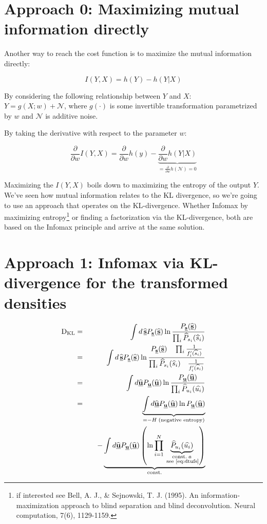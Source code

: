 \newpage

\section{Approach 0: Maximizing mutual information directly}

Another way to reach the cost function is to maximize the mutual information directly:

$$
I(Y,X) = h(Y) - h(Y|X)
$$

By considering the following relationship between $Y$ and $X$:\\
$Y = g(X;w) + \mathcal{N}$, where $g(\cdot)$ is some invertible transformation parametrized by $w$ and $\mathcal{N}$ is additive noise.

By taking the derivative with respect to the parameter $w$:

$$
\frac{\partial}{\partial w} I(Y,X) = \frac{\partial}{\partial w}h(y) - 
\underbrace{\frac{\partial}{\partial w} h(Y|X)}_{= \frac{\partial}{\partial w} h(\mathcal{N}) = 0}
$$

Maximizing the $I(Y,X)$ boils down to maximizing the entropy of the output $Y$. 
We've seen how mutual information relates to the KL divergence, so we're going to use an approach 
that operates on the KL-divergence. 
Whether Infomax by maximizing entropy\footnote{if interested see Bell, A. J., \& Sejnowski, T. J. (1995). An information-maximization approach to blind separation and blind deconvolution. Neural computation, 7(6), 1129-1159.} 
or finding a factorization via the KL-divergence,
both are based on the Infomax principle and arrive at the same solution.

\clearpage

\section{Approach 1: Infomax via KL-divergence for the transformed densities}
\begin{eqnarray}
  \dkl & = & \int d \, \widehat{\vec{s}} P_{\vec{s}}(\widehat{\vec{s}}) \ln \frac{P_{\vec{s}}(\widehat{\vec{s}})}{\prod_i \widehat{P}_{s_i}(\widehat{s}_i)}\\
  & = &  \int d \, \widehat{\vec{s}} P_{\vec{s}}(\widehat{\vec{s}}) \ln 
  \frac
  {P_{\vec{s}}(\widehat{\vec{s}}) \quad \prod_i \frac{1}{f_i' (\widehat{s}_i)}}
  {\prod_i \widehat{P}_{s_i}(\widehat{s}_i) \quad \frac{1}{f_i' (\widehat{s}_i)}} \\
  & = & \int d \widehat{\vec{u}} P_{\vec{u}} (\widehat{\vec{u}}) 
  \ln 
  \frac
  {P_{\vec{u}} (\widehat{\vec{u}}) }
  {\prod_i  \widehat{P}_{u_i}(\widehat{u_i})} \\
  & = & 
  \underbrace{
	  \int d \widehat{\vec{u}} P_{\vec{u}} (\widehat{\vec{u}}) 
	  \ln 
	  {P_{\vec{u}} (\widehat{\vec{u}}) }
  }_{= -H \; \text{(negative entropy)}}\\
  & & \quad -
  \underbrace{
	  \int d \widehat{\vec{u}} P_{\vec{u}} (\widehat{\vec{u}}) 
	  \left( \ln
	  {\prod_{i=1}^{N}
	  \underbrace{ 
		\widehat{P}_{u_i}(\widehat{u_i}) 
	  }_{\substack{\text{const.\;} a \\\text{\;see \eqref{eq:dtufs}}}}} 
	  \right)
	  }_{\text{const.}}
\end{eqnarray}

